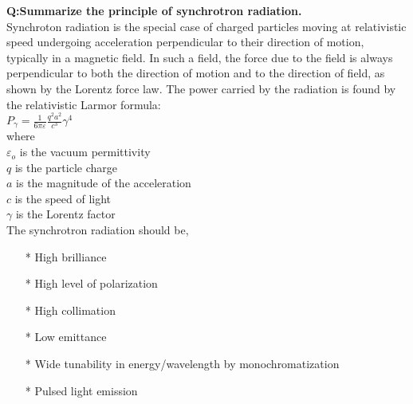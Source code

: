 \documentclass{article}
\begin{document}
\newpage
\noindent \textbf{Q:Summarize the principle of synchrotron radiation.}\\
\noindent Synchroton radiation is the special case of charged particles moving at relativistic speed undergoing acceleration perpendicular to their direction of motion, typically in a magnetic field. In such a field, the force due to the field is always perpendicular to both the direction of motion and to the direction of field, as shown by the Lorentz force law.
\noindent The power carried by the radiation is found by the relativistic Larmor formula:\\
\noindent $P_\gamma=\frac{1}{6\pi\varepsilon}\frac{q^2a^2}{c^3}\gamma^4$\\
\noindent where\\
\noindent $\varepsilon_o$ is the vacuum permittivity\\
\noindent $q$ is the particle charge\\
\noindent $a$ is the magnitude of the acceleration\\
\noindent $c$ is the speed of light\\
\noindent $\gamma$ is the Lorentz factor\\
\noindent The synchrotron radiation should be,\\
\begin{itemize}
\item[*] High brilliance
\item[*] High level of polarization
\item[*] High collimation
\item[*] Low emittance
\item[*] Wide tunability in energy/wavelength by monochromatization
\item[*] Pulsed light emission
\end{itemize}
\end{document}
